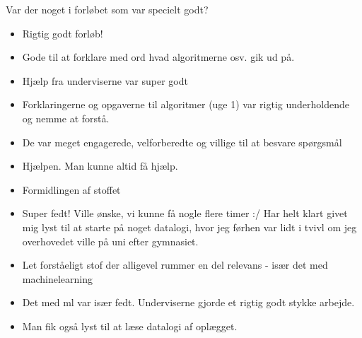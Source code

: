 \documentclass{article}
\begin{document}
            \begin{center}
                \large{Var der noget i forløbet som var specielt godt?}
            \end{center}
            \begin{itemize}
                \item Rigtig godt forløb!
                \item Gode til at forklare med ord hvad algoritmerne osv. gik ud på.
                \item Hjælp fra underviserne var super godt
                \item Forklaringerne og opgaverne til algoritmer (uge 1) var
                      rigtig underholdende og nemme at forstå.
                \item De var meget engagerede, velforberedte og villige til at
                      besvare spørgsmål
                \item Hjælpen. Man kunne altid få hjælp.
                \item Formidlingen af stoffet
                \item Super fedt! Ville ønske, vi kunne få nogle flere timer :/
                      Har helt klart givet mig lyst til at starte på noget datalogi,
                      hvor jeg førhen var lidt i tvivl om jeg overhovedet ville på
                      uni efter gymnasiet.
                \item Let forståeligt stof der alligevel rummer en del relevans -
                      især det med machinelearning
                \item Det med ml var især fedt. Underviserne gjorde et rigtig godt
                      stykke arbejde.
                \item Man fik også lyst til at læse datalogi af oplægget.
            \end{itemize}
\end{document}
